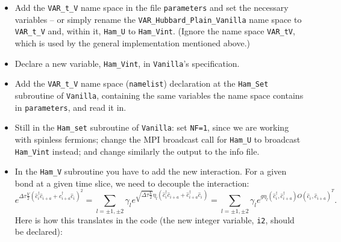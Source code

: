 \documentclass[10pt,modern]{scrartcl}
\numberwithin{exerciseitem}{exercise} %
\begin{document}
\begin{itemize}
\item  Add the \texttt{VAR\_t\_V} name space in the file \texttt{parameters} and set the necessary variables -- or simply rename the \texttt{VAR\_Hubbard\_Plain\_Vanilla} name space to \texttt{VAR\_t\_V} and, within it, \texttt{Ham\_U} to \texttt{Ham\_Vint}. (Ignore the name space \texttt{VAR\_tV}, which is used by the general implementation mentioned above.)
\item  Declare a new variable, \texttt{Ham\_Vint}, in \texttt{Vanilla}'s specification.
\item Add the \texttt{VAR\_t\_V} name space (\texttt{namelist}) declaration at the \texttt{Ham\_Set} subroutine of \texttt{Vanilla}, containing the same variables the name space contains in \texttt{parameters}, and read it in.
\item  Still in the  \texttt{Ham\_set} subroutine of \texttt{Vanilla}: set \texttt{NF=1}, since we are working with spinless fermions; change the MPI broadcast call for \texttt{Ham\_U} to broadcast \texttt{Ham\_Vint} instead; and change similarly the output to the info file.
\item  In the \texttt{Ham\_V} subroutine you have to add the new interaction. For a given bond at a given time slice, we need to decouple the interaction: 
\begin{equation}
e^{\Delta \tau \frac{V}{2} \left( \hat{c}^{\dagger}_{i}  \hat{c}^{\phantom\dagger}_{i+a}      + \hat{c}^{\dagger}_{i+a}  \hat{c}^{\phantom\dagger}_{i} \right)^2} = 
\sum_{l= \pm1, \pm 2} \gamma_l e^{ \sqrt{\Delta \tau \frac{V}{2}}  \eta_l   \left( \hat{c}^{\dagger}_{i}  \hat{c}^{\phantom\dagger}_{i+a}      + \hat{c}^{\dagger}_{i+a}  \hat{c}^{\phantom\dagger}_{i} \right) } =  \sum_{l= \pm1, \pm 2} \gamma_l e^{ g  \eta_l   \left( \hat{c}^{\dagger}_{i},  \hat{c}^{\dagger}_{i+a}  \right)  O 
    \left(\hat{c}^{\phantom\dagger}_{i},  \hat{c}^{\phantom\dagger}_{i+a} \right)^{T} }.
\end{equation}
 Here is  how this translates in the code (the new integer variable, \texttt{i2}, should be declared): 
 

\end{itemize}
\end{document}
